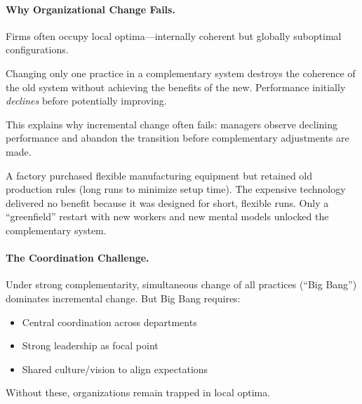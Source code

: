 \paragraph{Why Organizational Change Fails.}

Firms often occupy local optima---internally coherent but globally suboptimal 
configurations.

\begin{proposition}
\label{prop:worse-before}
Changing only one practice in a complementary system destroys the coherence of 
the old system without achieving the benefits of the new. Performance initially 
\emph{declines} before potentially improving.
\end{proposition}

This explains why incremental change often fails: managers observe declining 
performance and abandon the transition before complementary adjustments are made.

\begin{example}
A factory purchased flexible manufacturing equipment but retained old production 
rules (long runs to minimize setup time). The expensive technology delivered no 
benefit because it was designed for short, flexible runs. Only a ``greenfield'' 
restart with new workers and new mental models unlocked the complementary system.
\end{example}

\paragraph{The Coordination Challenge.}

\begin{proposition}
\label{prop:big-bang}
Under strong complementarity, simultaneous change of all practices (``Big Bang'') 
dominates incremental change. But Big Bang requires:
\begin{itemize}
    \item Central coordination across departments
    \item Strong leadership as focal point
    \item Shared culture/vision to align expectations
\end{itemize}
Without these, organizations remain trapped in local optima.
\end{proposition}


